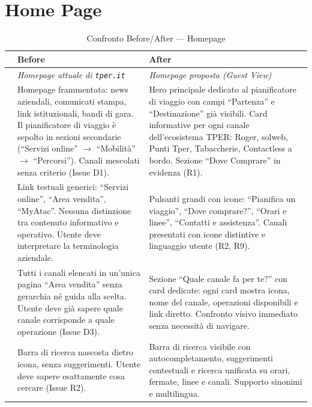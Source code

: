 \documentclass[11pt,a4paper]{article}
\begin{document}
\section{Home Page}

\begin{table}[H]
\centering
\small
\renewcommand{\arraystretch}{1.4}
\begin{tabular}{|p{0.5cm}|p{7cm}|p{7cm}|}
\hline
& \textbf{Before} & \textbf{After} \\ \hline
\cellcolor{primaryColor!15} &
\textit{Homepage attuale di \texttt{tper.it}} &
\textit{Homepage proposta (Guest View)} \\ \hline

\raisebox{0.5cm}{\rotatebox{90}{\textbf{Struttura}}} &
Homepage frammentata: news aziendali, comunicati stampa, link istituzionali, bandi di gara. Il pianificatore di viaggio \`e sepolto in sezioni secondarie (``Servizi online'' $\rightarrow$ ``Mobilit\`a'' $\rightarrow$ ``Percorsi''). Canali mescolati senza criterio (Issue D1). &
Hero principale dedicato al pianificatore di viaggio con campi ``Partenza'' e ``Destinazione'' gi\`a visibili. Card informative per ogni canale dell'ecosistema TPER: Roger, solweb, Punti Tper, Tabaccherie, Contactless a bordo. Sezione ``Dove Comprare'' in evidenza (R1). \\ \hline

\raisebox{0.5cm}{\rotatebox{90}{\textbf{CTA}}} &
Link testuali generici: ``Servizi online'', ``Area vendita'', ``MyAtac''. Nessuna distinzione tra contenuto informativo e operativo. Utente deve interpretare la terminologia aziendale. &
Pulsanti grandi con icone: ``Pianifica un viaggio'', ``Dove comprare?'', ``Orari e linee'', ``Contatti e assistenza''. Canali presentati con icone distintive e linguaggio utente (R2, R9). \\ \hline

\raisebox{0.5cm}{\rotatebox{90}{\textbf{Canali}}} &
Tutti i canali elencati in un'unica pagina ``Area vendita'' senza gerarchia n\'e guida alla scelta. Utente deve gi\`a sapere quale canale corrisponde a quale operazione (Issue D3). &
Sezione ``Quale canale fa per te?'' con card dedicate: ogni card mostra icona, nome del canale, operazioni disponibili e link diretto. Confronto visivo immediato senza necessit\`a di navigare. \\ \hline

\raisebox{0.5cm}{\rotatebox{90}{\textbf{Ricerca}}} &
Barra di ricerca nascosta dietro icona, senza suggerimenti. Utente deve sapere esattamente cosa cercare (Issue R2). &
Barra di ricerca visibile con autocompletamento, suggerimenti contestuali e ricerca unificata su orari, fermate, linee e canali. Supporto sinonimi e multilingua. \\ \hline
\end{tabular}
\caption{Confronto Before/After --- Homepage}
\label{tab:comp-homepage}
\end{table}
\end{document}
